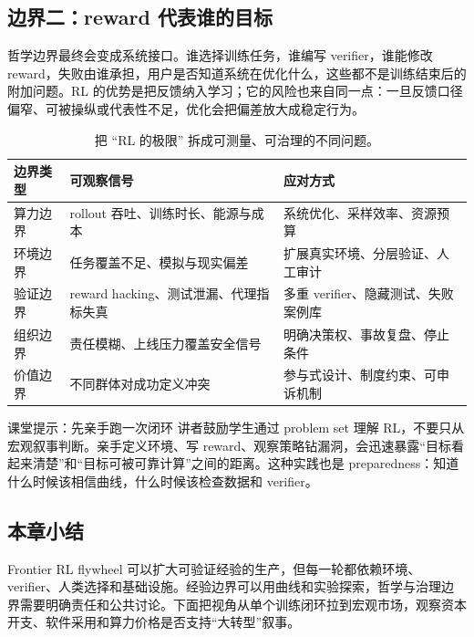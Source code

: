 \subsection{边界二：reward 代表谁的目标}

哲学边界最终会变成系统接口。谁选择训练任务，谁编写 verifier，谁能修改 reward，失败由谁承担，用户是否知道系统在优化什么，这些都不是训练结束后的附加问题。RL 的优势是把反馈纳入学习；它的风险也来自同一点：一旦反馈口径偏窄、可被操纵或代表性不足，优化会把偏差放大成稳定行为。

\begin{table}[H]
\centering
\begin{tabular}{L{0.2\textwidth}L{0.31\textwidth}L{0.39\textwidth}}
\toprule
边界类型 & 可观察信号 & 应对方式 \\
\midrule
算力边界 & rollout 吞吐、训练时长、能源与成本 & 系统优化、采样效率、资源预算 \\
环境边界 & 任务覆盖不足、模拟与现实偏差 & 扩展真实环境、分层验证、人工审计 \\
验证边界 & reward hacking、测试泄漏、代理指标失真 & 多重 verifier、隐藏测试、失败案例库 \\
组织边界 & 责任模糊、上线压力覆盖安全信号 & 明确决策权、事故复盘、停止条件 \\
价值边界 & 不同群体对成功定义冲突 & 参与式设计、制度约束、可申诉机制 \\
\bottomrule
\end{tabular}
\caption{把 ``RL 的极限'' 拆成可测量、可治理的不同问题。}
\end{table}

\begin{knowledgebox}{课堂提示：先亲手跑一次闭环}
讲者鼓励学生通过 problem set 理解 RL，不要只从宏观叙事判断。亲手定义环境、写 reward、观察策略钻漏洞，会迅速暴露“目标看起来清楚”和“目标可被可靠计算”之间的距离。这种实践也是 preparedness：知道什么时候该相信曲线，什么时候该检查数据和 verifier。
\end{knowledgebox}

\subsection{本章小结}

Frontier RL flywheel 可以扩大可验证经验的生产，但每一轮都依赖环境、verifier、人类选择和基础设施。经验边界可以用曲线和实验探索，哲学与治理边界需要明确责任和公共讨论。下面把视角从单个训练闭环拉到宏观市场，观察资本开支、软件采用和算力价格是否支持“大转型”叙事。

